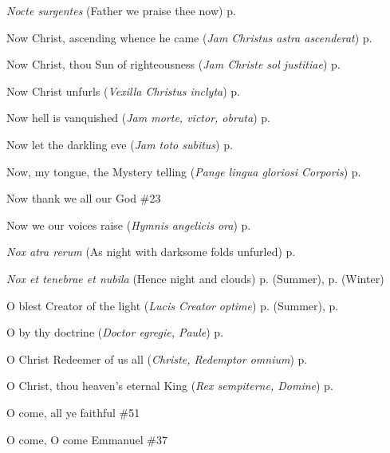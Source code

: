\begin{hangparas}{1.25em}{1}
\par\noindent
\textit{Nocte surgentes} (Father we praise thee now) \dotfill p. \pageref{SundayInvitatorySummer}
\par\noindent
Now Christ, ascending whence he came (\textit{Jam Christus astra ascenderat}) \dotfill p. \pageref{WhitsundayInvitatory}
\par\noindent
Now Christ, thou Sun of righteousness (\textit{Jam Christe sol justitiae}) \dotfill p. \pageref{FirstLentMattins}
\par\noindent
Now Christ unfurls (\textit{Vexilla Christus inclyta}) \dotfill p. \pageref{ChristTheKingMattins}
\par\noindent
Now hell is vanquished (\textit{Jam morte, victor, obruta}) \dotfill p. \pageref{HolyRosaryMattins}
\par\noindent
Now let the darkling eve (\textit{Jam toto subitus}) \dotfill p. \pageref{SevenSorrowsEvensong}
\par\noindent
Now, my tongue, the Mystery telling (\textit{Pange lingua gloriosi Corporis}) \dotfill p. \pageref{CorpusChristiEvensong}
\par\noindent
Now thank we all our God \dotfill \#23
\par\noindent
Now we our voices raise (\textit{Hymnis angelicis ora}) \dotfill p. \pageref{ScholasticaInvitatory}
\par\noindent
\textit{Nox atra rerum} (As night with darksome folds unfurled) \dotfill p. \pageref{ThursdayInvitatory}
\par\noindent
\textit{Nox et tenebrae et nubila} (Hence night and clouds) \dotfill p. \pageref{WednesdayMattinsSummer} (Summer), p. \pageref{WednesdayMattinsWinter} (Winter)
\par\noindent
O blest Creator of the light (\textit{Lucis Creator optime}) \dotfill p. \pageref{SundayEvensongSummer} (Summer), p. \pageref{SundayEvensongWinter}
\par\noindent
O by thy doctrine (\textit{Doctor egregie, Paule}) \dotfill p. \pageref{PaulEvensong}
\par\noindent
O Christ Redeemer of us all (\textit{Christe, Redemptor omnium}) \dotfill p. \pageref{AllHallowsEvensong}
\par\noindent
O Christ, thou heaven's eternal King (\textit{Rex sempiterne, Domine}) \dotfill p. \pageref{EasterInvitatory}
\par\noindent
O come, all ye faithful \dotfill \#51
\par\noindent
O come, O come Emmanuel \dotfill \#37
\par\noindent

\end{hangparas}
